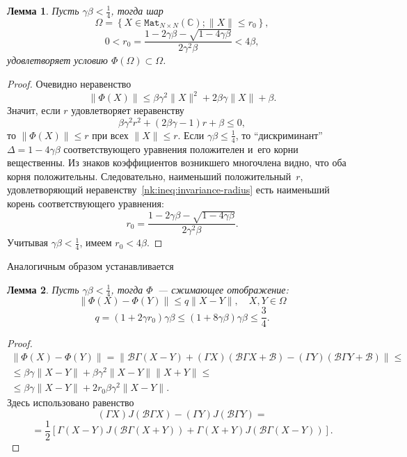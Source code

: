 \documentclass[14pt,a4paper]{extarticle}
\newtheorem{lem}{Лемма}
\theoremstyle{definition}
\begin{document}
\begin{lem}
    Пусть \( \gamma\beta < \frac14\),
    тогда шар
    \[
        \Omega = \left\{ X\in \mathtt{Mat}_{N{\times}N}(\mathbb{C}); \|X\| \leq r_0 \right\}, \]
    \[  0 < r_0 = \frac{1 - 2\gamma\beta - \sqrt{1-4\gamma\beta}}{2\gamma^2\beta} < 4\beta, \]
    удовле\-творяет условию \( \Phi(\Omega)\subset\Omega \).
\end{lem}
\begin{proof}
Очевидно неравенство
    \[ \| \Phi(X) \| \leq
     \beta \gamma^2 \|X\|^2 + 2\beta\gamma\|X\| + \beta. \]
Значит, если \( r \) удовле\-творяет неравенству
    \begin{equation}\label{nk:ineq:invariance-radius}
        \beta \gamma^2 r^2 + (2\beta\gamma - 1)r + \beta \leq 0,
    \end{equation}
    то \( \|\Phi(X)\| \leq r \) при всех \( \|X\| \leq r \).
Если \( \gamma\beta \leq \frac14 \),
    то ``дискриминант'' \( \Delta = 1-4\gamma\beta \)
    соответствующего уравнения положителен и~его корни вещественны.
Из знаков коэффициентов возникшего многочлена видно, что оба корня положительны.
Следовательно, наименьший положительный~\( r \),
    удовле\-творя\-ющий неравенству~\eqref{nk:ineq:invariance-radius}
    есть наименьший корень
    соответствующего уравнения:
    \[ r_0 = \frac{1 - 2\gamma\beta - \sqrt{1-4\gamma\beta}}{2\gamma^2\beta}. \]
Учитывая \( \gamma\beta<\frac14 \), имеем \( r_0 < 4\beta \).
\end{proof}

Аналогичным образом устанавливается
\begin{lem}
    Пусть \(\gamma\beta<\frac14\),
    тогда \( \Phi \)~--- сжимающее отображение:
    \[ \| \Phi(X) - \Phi(Y) \| \leq q \|X - Y\|, \quad X,Y\in\Omega \]
    \[ q = (1+2\gamma r_0) \gamma\beta \leq (1+8\gamma\beta)\gamma\beta \leq \frac34. \]
\end{lem}
\begin{proof}
    \begin{align*} \| \Phi(X) - \Phi(Y) \| = \| \mathcal{B}\Gamma (X-Y) + (\Gamma X)(\mathcal{B}\Gamma X + \mathcal{B})
     - (\Gamma Y)(\mathcal{B} \Gamma Y + \mathcal{B}) \| \leq \\
        \leq
     \beta\gamma\|X-Y\| +
     \beta \gamma^2 \|X-Y\| \|X+Y\| \leq \\
        \leq
     \beta\gamma\|X-Y\| +
      2 r_0 \beta \gamma^2 \|X-Y\|.
    \end{align*}
Здесь использовано равенство
\[ (\Gamma X) J(\mathcal{B}\Gamma X) - (\Gamma Y) J(\mathcal{B}\Gamma Y) =
  \]
 \[= \frac12\left[
        \Gamma(X-Y) J(\mathcal{B}\Gamma(X+Y))
    +   \Gamma(X+Y) J(\mathcal{B}\Gamma(X-Y))
  \right].
\]
\end{proof}
\end{document}
